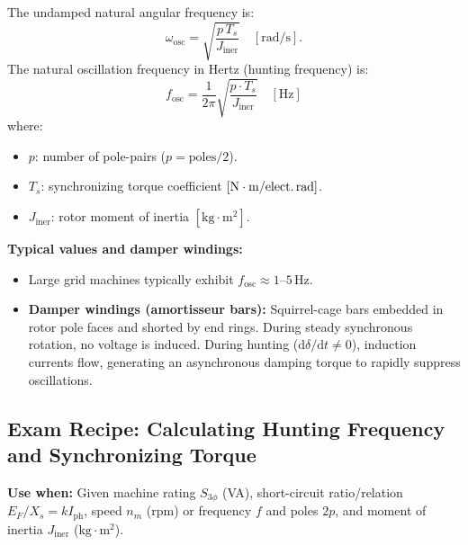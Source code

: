 The undamped natural angular frequency is:
\begin{equation}
\omega_{\mathrm{osc}} = \sqrt{\frac{p\,T_s}{J_{\mathrm{iner}}}} \quad [\mathrm{rad/s}].
\end{equation}
The natural oscillation frequency in Hertz (hunting frequency) is:
\begin{equation}
\boxed{f_{\mathrm{osc}} = \frac{1}{2\pi}\sqrt{\frac{p\cdot T_s}{J_{\mathrm{iner}}}} \quad [\mathrm{Hz}]}
\end{equation}
where:
\begin{itemize}
  \item $p$: number of pole-pairs ($p = \text{poles}/2$).
  \item $T_s$: synchronizing torque coefficient $[\mathrm{N\cdot m/\text{elect.\,rad}}]$.
  \item $J_{\mathrm{iner}}$: rotor moment of inertia $[\mathrm{kg\cdot m^2}]$.
\end{itemize}
\textbf{Typical values and damper windings:}
\begin{itemize}
  \item Large grid machines typically exhibit $f_{\mathrm{osc}} \approx 1\text{--}5\,\mathrm{Hz}$.
  \item \textbf{Damper windings (amortisseur bars):} Squirrel-cage bars embedded in rotor pole faces and shorted by end rings. During steady synchronous rotation, no voltage is induced. During hunting ($\mathrm{d}\delta/\mathrm{d}t \neq 0$), induction currents flow, generating an asynchronous damping torque to rapidly suppress oscillations.
\end{itemize}

\subsection{Exam Recipe: Calculating Hunting Frequency and Synchronizing Torque}
\textbf{Use when:} Given machine rating $S_{3\phi}$ (VA), short-circuit ratio/relation $E_F/X_s = k I_{\mathrm{ph}}$, speed $n_m$ (rpm) or frequency $f$ and poles $2p$, and moment of inertia $J_{\mathrm{iner}}$ ($\mathrm{kg\cdot m^2}$).

